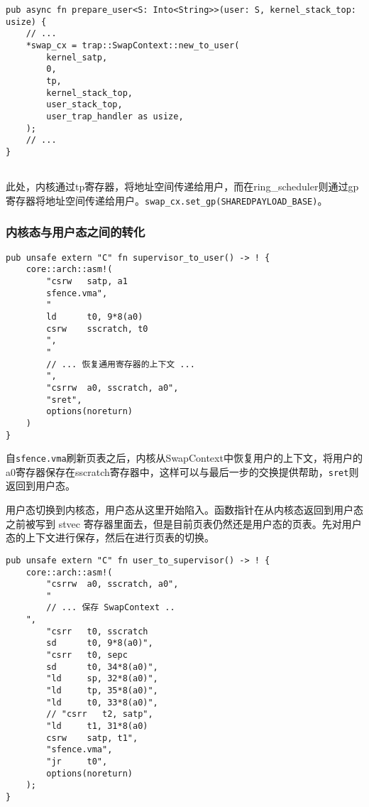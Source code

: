 \begin{lstlisting}[caption=将地址空间信息传递给用户]
pub async fn prepare_user<S: Into<String>>(user: S, kernel_stack_top: usize) {
    // ...
    *swap_cx = trap::SwapContext::new_to_user(
        kernel_satp,
        0,
        tp,
        kernel_stack_top,
        user_stack_top,
        user_trap_handler as usize,
    );
    // ...
}
    
\end{lstlisting}

此处，内核通过tp寄存器，将地址空间传递给用户，而在ring\_scheduler则通过gp寄存器将地址空间传递给用户。\verb|swap_cx.set_gp(SHAREDPAYLOAD_BASE)|。


\subsubsection{内核态与用户态之间的转化}

\begin{lstlisting}[caption=由内核态进入用户态]
pub unsafe extern "C" fn supervisor_to_user() -> ! {
    core::arch::asm!(
        "csrw   satp, a1
        sfence.vma",
        "
        ld      t0, 9*8(a0)
        csrw    sscratch, t0
        ",
        "
        // ... 恢复通用寄存器的上下文 ...
        ",
        "csrrw  a0, sscratch, a0",
        "sret",
        options(noreturn)
    )
}
\end{lstlisting}

自\verb|sfence.vma|刷新页表之后，内核从SwapContext中恢复用户的上下文，将用户的a0寄存器保存在sscratch寄存器中，这样可以与最后一步的交换提供帮助，\verb|sret|则返回到用户态。


用户态切换到内核态，用户态从这里开始陷入。函数指针在从内核态返回到用户态之前被写到 stvec 寄存器里面去，但是目前页表仍然还是用户态的页表。先对用户态的上下文进行保存，然后在进行页表的切换。

\begin{lstlisting}[caption=由用户态进入内核态]
pub unsafe extern "C" fn user_to_supervisor() -> ! {
    core::arch::asm!(
        "csrrw  a0, sscratch, a0",
        "
        // ... 保存 SwapContext ..
    ",
        "csrr   t0, sscratch
        sd      t0, 9*8(a0)",
        "csrr   t0, sepc
        sd      t0, 34*8(a0)",
        "ld     sp, 32*8(a0)",
        "ld     tp, 35*8(a0)",
        "ld     t0, 33*8(a0)",
        // "csrr   t2, satp",
        "ld     t1, 31*8(a0)
        csrw    satp, t1",
        "sfence.vma",
        "jr     t0",
        options(noreturn)
    );
}
\end{lstlisting}



